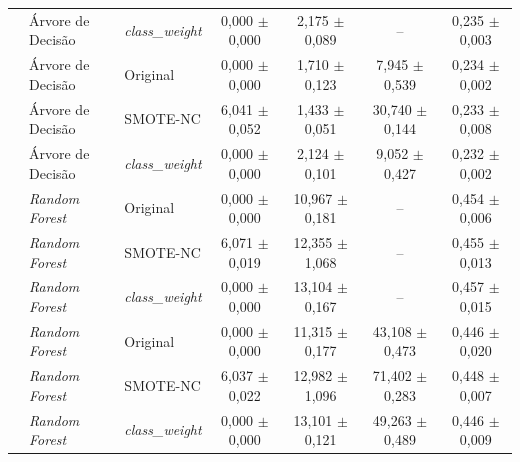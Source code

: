 \begin{table}[htb]
{\begin{tabular}{lllcccc}
     & Árvore de Decisão & \textit{class\_weight} & 0,000 $\pm$ 0,000 & 2,175 $\pm$ 0,089 & -- & 0,235 $\pm$ 0,003 \\
     & Árvore de Decisão & Original & 0,000 $\pm$ 0,000 & 1,710 $\pm$ 0,123 & 7,945 $\pm$ 0,539 & 0,234 $\pm$ 0,002 \\
     & Árvore de Decisão & SMOTE-NC & 6,041 $\pm$ 0,052 & 1,433 $\pm$ 0,051 & 30,740 $\pm$ 0,144 & 0,233 $\pm$ 0,008 \\
     & Árvore de Decisão & \textit{class\_weight} & 0,000 $\pm$ 0,000 & 2,124 $\pm$ 0,101 & 9,052 $\pm$ 0,427 & 0,232 $\pm$ 0,002 \\
     & \textit{Random Forest} & Original & 0,000 $\pm$ 0,000 & 10,967 $\pm$ 0,181 & -- & 0,454 $\pm$ 0,006 \\
     & \textit{Random Forest} & SMOTE-NC & 6,071 $\pm$ 0,019 & 12,355 $\pm$ 1,068 & -- & 0,455 $\pm$ 0,013 \\
     & \textit{Random Forest} & \textit{class\_weight} & 0,000 $\pm$ 0,000 & 13,104 $\pm$ 0,167 & -- & 0,457 $\pm$ 0,015 \\
     & \textit{Random Forest} & Original & 0,000 $\pm$ 0,000 & 11,315 $\pm$ 0,177 & 43,108 $\pm$ 0,473 & 0,446 $\pm$ 0,020 \\
     & \textit{Random Forest} & SMOTE-NC & 6,037 $\pm$ 0,022 & 12,982 $\pm$ 1,096 & 71,402 $\pm$ 0,283 & 0,448 $\pm$ 0,007 \\
     & \textit{Random Forest} & \textit{class\_weight} & 0,000 $\pm$ 0,000 & 13,101 $\pm$ 0,121 & 49,263 $\pm$ 0,489 & 0,446 $\pm$ 0,009 \\
    \hline
  \end{tabular}}
\end{table}
